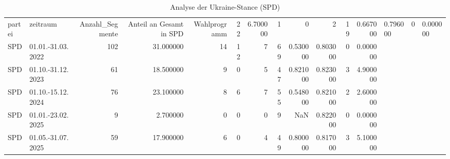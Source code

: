 \begin{table}
\caption{Analyse der Ukraine-Stance (SPD)}
\label{tab:meine_tabelle}
\begin{tabular}{llrrrrrrrrrr}
\toprule
partei & zeitraum & Anzahl_Segmente & Anteil an Gesamt in %
\midrule
SPD & Wahlprogramm & 22 & 6.700000 & 1 & 0 & 2 & 19 & 0.667000 & 0.796000 & 0 & 0.000000 \\
SPD & 01.01.-31.03.2022 & 102 & 31.000000 & 14 & 12 & 7 & 69 & 0.530000 & 0.803000 & 0 & 0.000000 \\
SPD & 01.10.-31.12.2023 & 61 & 18.500000 & 9 & 0 & 5 & 47 & 0.821000 & 0.823000 & 3 & 4.900000 \\
SPD & 01.10.-15.12.2024 & 76 & 23.100000 & 8 & 6 & 7 & 55 & 0.548000 & 0.821000 & 2 & 2.600000 \\
SPD & 01.01.-23.02.2025 & 9 & 2.700000 & 0 & 0 & 0 & 9 & NaN & 0.822000 & 0 & 0.000000 \\
SPD & 01.05.-31.07.2025 & 59 & 17.900000 & 6 & 0 & 4 & 49 & 0.800000 & 0.817000 & 3 & 5.100000 \\
\bottomrule
\end{tabular}
\end{table}
